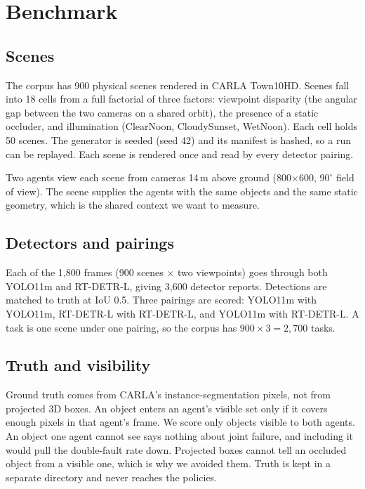 \section{Benchmark}

\subsection{Scenes}
The corpus has 900 physical scenes rendered in CARLA Town10HD. Scenes fall
into 18 cells from a full factorial of three factors: viewpoint disparity
(the angular gap between the two cameras on a shared orbit), the presence of a
static occluder, and illumination (ClearNoon, CloudySunset, WetNoon). Each
cell holds 50 scenes. The generator is seeded (seed 42) and its manifest is
hashed, so a run can be replayed. Each scene is rendered once and read by
every detector pairing.

Two agents view each scene from cameras 14\,m above ground (800$\times$600,
$90^\circ$ field of view). The scene supplies the agents with the same objects
and the same static geometry, which is the shared context we want to measure.

\subsection{Detectors and pairings}
Each of the 1{,}800 frames (900 scenes $\times$ two viewpoints) goes through
both YOLO11m and RT-DETR-L, giving 3{,}600 detector reports. Detections are
matched to truth at IoU 0.5. Three pairings are scored: YOLO11m with
YOLO11m, RT-DETR-L with RT-DETR-L, and YOLO11m with RT-DETR-L. A task is one
scene under one pairing, so the corpus has $900\times 3 = 2{,}700$ tasks.

\subsection{Truth and visibility}
Ground truth comes from CARLA's instance-segmentation pixels, not from
projected 3D boxes. An object enters an agent's visible set only if it covers
enough pixels in that agent's frame. We score only objects visible to both
agents. An object one agent cannot see says nothing about joint failure, and
including it would pull the double-fault rate down. Projected boxes cannot
tell an occluded object from a visible one, which is why we avoided them.
Truth is kept in a separate directory and never reaches the policies.
